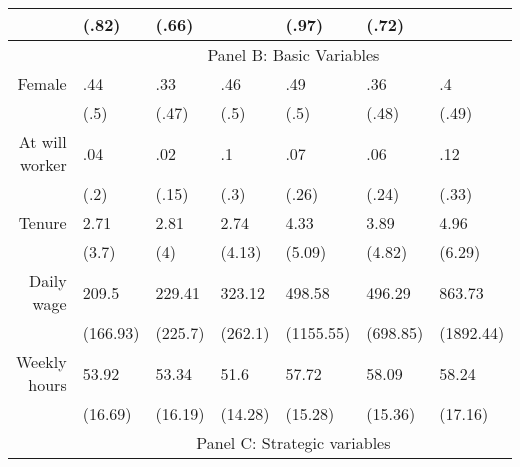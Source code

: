 \begin{tabular}{rrrrrrr}
      & \multicolumn{1}{l}{(.82)} & \multicolumn{1}{l}{(.66)} & \multicolumn{1}{l}{} & \multicolumn{1}{l}{(.97)} & \multicolumn{1}{l}{(.72)} & \multicolumn{1}{l}{} \\
      \midrule
      & \multicolumn{6}{c}{Panel B: Basic Variables} \\
      \midrule
      \midrule
Female & \multicolumn{1}{l}{.44} & \multicolumn{1}{l}{.33} & \multicolumn{1}{l}{.46} & \multicolumn{1}{l}{.49} & \multicolumn{1}{l}{.36} & \multicolumn{1}{l}{.4} \\
      & \multicolumn{1}{l}{(.5)} & \multicolumn{1}{l}{(.47)} & \multicolumn{1}{l}{(.5)} & \multicolumn{1}{l}{(.5)} & \multicolumn{1}{l}{(.48)} & \multicolumn{1}{l}{(.49)} \\
At will worker & \multicolumn{1}{l}{.04} & \multicolumn{1}{l}{.02} & \multicolumn{1}{l}{.1} & \multicolumn{1}{l}{.07} & \multicolumn{1}{l}{.06} & \multicolumn{1}{l}{.12} \\
      & \multicolumn{1}{l}{(.2)} & \multicolumn{1}{l}{(.15)} & \multicolumn{1}{l}{(.3)} & \multicolumn{1}{l}{(.26)} & \multicolumn{1}{l}{(.24)} & \multicolumn{1}{l}{(.33)} \\
Tenure & \multicolumn{1}{l}{2.71} & \multicolumn{1}{l}{2.81} & \multicolumn{1}{l}{2.74} & \multicolumn{1}{l}{4.33} & \multicolumn{1}{l}{3.89} & \multicolumn{1}{l}{4.96} \\
      & \multicolumn{1}{l}{(3.7)} & \multicolumn{1}{l}{(4)} & \multicolumn{1}{l}{(4.13)} & \multicolumn{1}{l}{(5.09)} & \multicolumn{1}{l}{(4.82)} & \multicolumn{1}{l}{(6.29)} \\
Daily wage & \multicolumn{1}{l}{209.5} & \multicolumn{1}{l}{229.41} & \multicolumn{1}{l}{323.12} & \multicolumn{1}{l}{498.58} & \multicolumn{1}{l}{496.29} & \multicolumn{1}{l}{863.73} \\
      & \multicolumn{1}{l}{(166.93)} & \multicolumn{1}{l}{(225.7)} & \multicolumn{1}{l}{(262.1)} & \multicolumn{1}{l}{(1155.55)} & \multicolumn{1}{l}{(698.85)} & \multicolumn{1}{l}{(1892.44)} \\
Weekly hours & \multicolumn{1}{l}{53.92} & \multicolumn{1}{l}{53.34} & \multicolumn{1}{l}{51.6} & \multicolumn{1}{l}{57.72} & \multicolumn{1}{l}{58.09} & \multicolumn{1}{l}{58.24} \\
      & \multicolumn{1}{l}{(16.69)} & \multicolumn{1}{l}{(16.19)} & \multicolumn{1}{l}{(14.28)} & \multicolumn{1}{l}{(15.28)} & \multicolumn{1}{l}{(15.36)} & \multicolumn{1}{l}{(17.16)} \\
      \midrule
      & \multicolumn{6}{c}{Panel C: Strategic variables} \\

\end{tabular}
